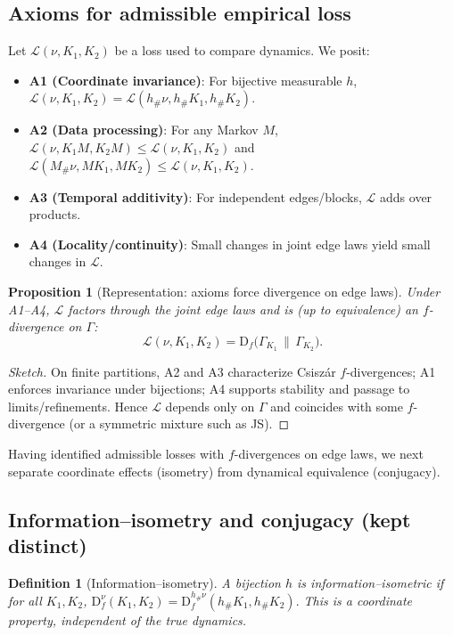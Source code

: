 \documentclass[11pt]{article}
\newtheorem{definition}{Definition}
\newtheorem{proposition}{Proposition}
\newcommand{\Df}{\mathrm{D}_f}
\newcommand{\1}{\mathbf{1}}
\newcommand{\push}{\#}
\begin{document}
\subsection{Axioms for admissible empirical loss}
Let \(\mathcal L(\nu,K_1,K_2)\) be a loss used to compare dynamics. We posit:
\begin{itemize}[leftmargin=1.7em,itemsep=2pt,topsep=2pt]
\item \textbf{A1 (Coordinate invariance)}: For bijective measurable \(h\),
\(\mathcal L(\nu,K_1,K_2)=\mathcal L(h_\push\nu,h_\push K_1,h_\push K_2)\).
\item \textbf{A2 (Data processing)}: For any Markov \(M\),
\(\mathcal L(\nu,K_1M,K_2M)\le \mathcal L(\nu,K_1,K_2)\) and 
\(\mathcal L(M_\push\nu,MK_1,MK_2)\le \mathcal L(\nu,K_1,K_2)\).
\item \textbf{A3 (Temporal additivity)}: For independent edges/blocks, \(\mathcal L\) adds over products.
\item \textbf{A4 (Locality/continuity)}: Small changes in joint edge laws yield small changes in \(\mathcal L\).
\end{itemize}

\begin{proposition}[Representation: axioms force divergence on edge laws]\label{prop:representation}
Under A1--A4, \(\mathcal L\) factors through the joint edge laws and is (up to equivalence) an \(f\)-divergence on \(\Gamma\):
\[
\mathcal L(\nu,K_1,K_2)=\Df\!\big(\Gamma_{K_1}\,\big\|\,\Gamma_{K_2}\big).
\]
\end{proposition}
\begin{proof}[Sketch]
On finite partitions, A2 and A3 characterize Csisz\'ar \(f\)-divergences; A1 enforces invariance under bijections; A4 supports stability and passage to limits/refinements. Hence \(\mathcal L\) depends only on \(\Gamma\) and coincides with some \(f\)-divergence (or a symmetric mixture such as JS).
\end{proof}
Having identified admissible losses with $f$-divergences on edge laws, we next separate coordinate effects (isometry) from dynamical equivalence (conjugacy).

\subsection{Information--isometry and conjugacy (kept distinct)}
\begin{definition}[Information--isometry]
A bijection \(h\) is information--isometric if for all \(K_1,K_2\),
\(
\Df^{\nu}(K_1,K_2)=\Df^{h_\push\nu}(h_\push K_1,h_\push K_2).
\)
This is a \emph{coordinate} property, independent of the true dynamics.
\end{definition}
\end{document}
